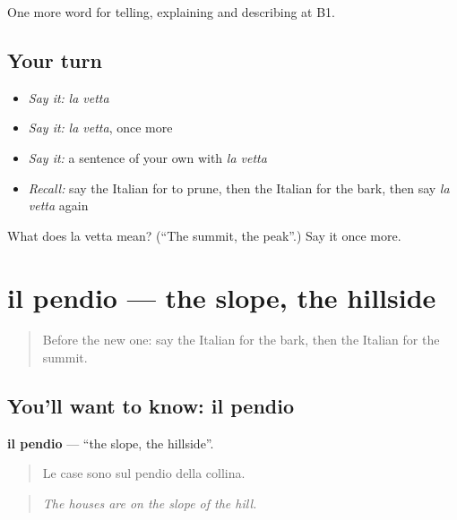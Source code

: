 \begin{grammarlens}[title={What you've built}]
One more word for telling, explaining and describing at B1.
\end{grammarlens}

\subsection*{Your turn}
\begin{itemize}
\raggedright
  \item \emph{Say it:} \emph{la vetta}
  \item \emph{Say it:} \emph{la vetta}, once more
  \item \emph{Say it:} a sentence of your own with \emph{la vetta}
  \item \emph{Recall:} say the Italian for to prune, then the Italian for the bark, then say \emph{la vetta} again
\end{itemize}

\begin{tcolorbox}[breakable,colback=teal!4,colframe=teal!35!black,title={Before you move on}]
What does la vetta mean? (\textquotedblleft{}The summit, the peak\textquotedblright{}.) Say it once more.
\end{tcolorbox}
\section[il pendio]{il pendio — the slope, the hillside}

\label{lesson:IT-C462-pendio}



\begin{quote}
Before the new one: say the Italian for the bark, then the Italian for the summit.
\end{quote}

\subsection*{You'll want to know: il pendio}
\textbf{il pendio} — \textquotedblleft{}the slope, the hillside\textquotedblright{}.

\begin{quote}
Le case sono sul pendio della collina.
\end{quote}

\begin{quote}
\emph{The houses are on the slope of the hill.}
\end{quote}

